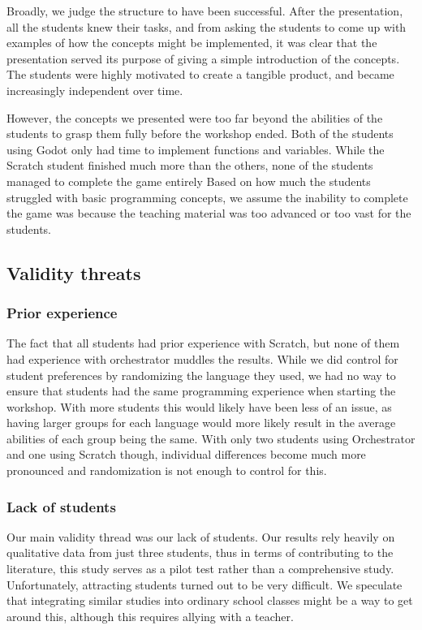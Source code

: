 Broadly, we judge the structure to have been successful.
After the presentation, all the students knew their tasks, and from asking the students to come up with examples of how the concepts might be implemented, it was clear that the presentation served its purpose of giving a simple introduction of the concepts.
The students were highly motivated to create a tangible product, and became increasingly independent over time.

However, the concepts we presented were too far beyond the abilities of the students to grasp them fully before the workshop ended.
Both of the students using Godot only had time to implement functions and variables.
While the Scratch student finished much more than the others, none of the students managed to complete the game entirely Based on how much the students struggled with basic programming concepts, we assume the inability to complete the game was because the teaching material was too advanced or too vast for the students.

\subsection{Validity threats}

\subsubsection{Prior experience}
The fact that all students had prior experience with Scratch, but none of them had experience with orchestrator muddles the results.
While we did control for student preferences by randomizing the language they used, we had no way to ensure that students had the same programming experience when starting the workshop.
With more students this would likely have been less of an issue, as having larger groups for each language would more likely result in the average abilities of each group being the same.
With only two students using Orchestrator and one using Scratch though, individual differences become much more pronounced and randomization is not enough to control for this.

\subsubsection{Lack of students}
Our main validity thread was our lack of students.
Our results rely heavily on qualitative data from just three students, thus in terms of contributing to the literature, this study serves as a pilot test rather than a comprehensive study.
Unfortunately, attracting students turned out to be very difficult.
We speculate that integrating similar studies into ordinary school classes might be a way to get around this, although this requires allying with a teacher.

